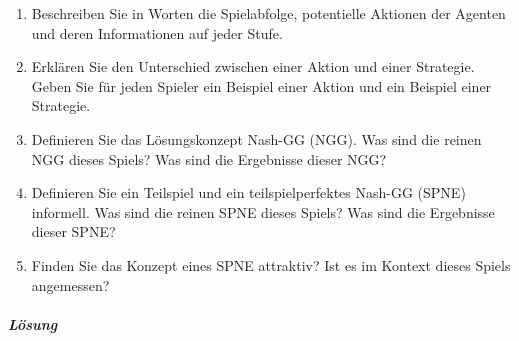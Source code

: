 \begin{enumerate}
  \item Beschreiben Sie in Worten die Spielabfolge, potentielle Aktionen der Agenten und
    deren Informationen auf jeder Stufe.

  \item Erklären Sie den Unterschied zwischen einer Aktion und einer Strategie. Geben Sie
    für jeden Spieler ein Beispiel einer Aktion und ein Beispiel einer Strategie.

  \item Definieren Sie das Lösungskonzept Nash-GG (NGG). Was sind die reinen NGG dieses
    Spiels? Was sind die Ergebnisse dieser NGG?

  \item Definieren Sie ein Teilspiel und ein teilspielperfektes Nash-GG (SPNE) informell.
    Was sind die reinen SPNE dieses Spiels? Was sind die Ergebnisse dieser SPNE?

  \item Finden Sie das Konzept eines SPNE attraktiv? Ist es im Kontext dieses Spiels
    angemessen?
\end{enumerate}

\subparagraph{Lösung}%

